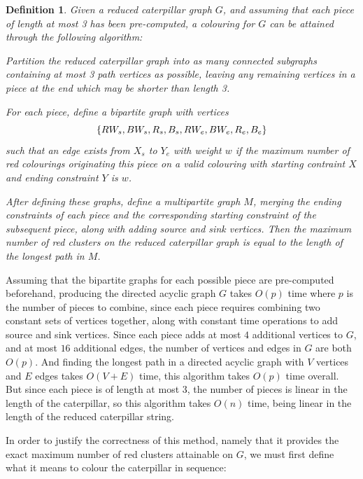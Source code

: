 \documentclass{mpaper}
\newtheorem{definition}[theorem]{Definition}
\begin{document}
\begin{definition}
\label{def/caterpillar-algorithm}
  Given a reduced caterpillar graph $G$, and assuming that each piece of length at most 3 has been pre-computed, a colouring for $G$ can be attained through the following algorithm:

  Partition the reduced caterpillar graph into as many connected subgraphs containing at most 3 path vertices as possible, leaving any remaining vertices in a piece at the end which may be shorter than length 3.

  For each piece, define a bipartite graph with vertices $$\{RW_{s}, BW_{s}, R_{s}, B_{s}, \\ RW_{e}, BW_{e}, R_{e}, B_{e}\}$$ such that an edge exists from $X_{s}$ to $Y_{e}$ with weight $w$ if the maximum number of red colourings originating this piece on a valid colouring with starting contraint $X$ and ending constraint $Y$ is $w$.

  After defining these graphs, define a multipartite graph $M$, merging the ending constraints of each piece and the corresponding starting constraint of the subsequent piece, along with adding source and sink vertices. Then the maximum number of red clusters on the reduced caterpillar graph is equal to the length of the longest path in $M$.
\end{definition}


Assuming that the bipartite graphs for each possible piece are pre-computed beforehand, producing the directed acyclic graph $G$ takes $O(p)$ time where $p$ is the number of pieces to combine, since each piece requires combining two constant sets of vertices together, along with constant time operations to add source and sink vertices. Since each piece adds at most $4$ additional vertices to $G$, and at most $16$ additional edges, the number of vertices and edges in $G$ are both $O(p)$. And finding the longest path in a directed acyclic graph with $V$ vertices and $E$ edges takes $O(V+E)$ time, this algorithm takes $O(p)$ time overall. But since each piece is of length at most 3, the number of pieces is linear in the length of the caterpillar, so this algorithm takes $O(n)$ time, being linear in the length of the reduced caterpillar string.


In order to justify the correctness of this method, namely that it provides the exact maximum number of red clusters attainable on $G$, we must first define what it means to colour the caterpillar in sequence:
\end{document}
